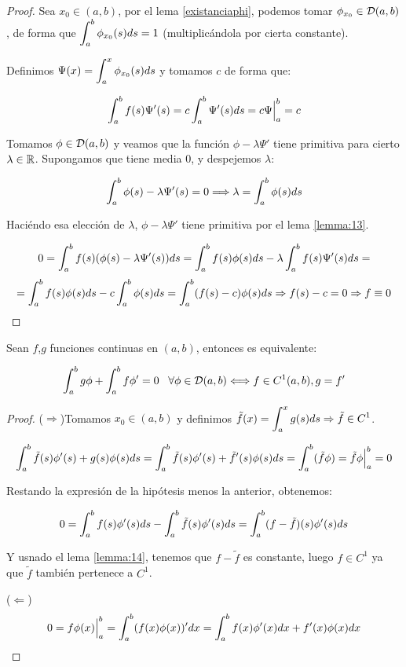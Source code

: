 \begin{proof}
Sea $x_0\in(a,b)$, por el lema \ref{existanciaphi}, podemos tomar $\phi_{x_0}\in \mathcal{D}(a,b)$, de forma que $\displaystyle\int_{ a }^{ b } \phi_{x_0}(s)ds=1$ (multiplicándola por cierta constante). 

Definimos $\Psi(x)=\displaystyle\int_{ a }^{ x } \phi_{x_0}(s)ds$ y tomamos $c$ de forma que:

\[
\displaystyle\int_{ a }^{ b } f(s)\Psi'(s)=c\displaystyle\int_{ a }^{ b } \Psi'(s)ds=c\Psi\Big|_a^b=c
\]

Tomamos $\phi\in\mathcal{D}(a,b)$ y veamos que la función $\phi-\lambda\Psi'$ tiene primitiva para cierto $\lambda\in\mathbb{R}$. Supongamos que tiene media 0, y despejemos $\lambda$:

\[
\displaystyle\int_{ a }^{ b } \phi(s)-\lambda\Psi'(s)=0 \Longrightarrow \lambda=\displaystyle\int_{ a }^{ b } \phi(s)ds
\]

Haciéndo esa elección de $\lambda$, $\phi-\lambda\Psi'$ tiene primitiva por el lema \ref{lemma:13}.

\[
0=\displaystyle\int_{ a }^{ b } f(s)(\phi(s)-\lambda\Psi'(s))ds=\displaystyle\int_{ a }^{ b } f(s)\phi(s)ds-\lambda\displaystyle\int_{ a }^{ b } f(s)\Psi'(s)ds=
\]
\[
=\displaystyle\int_{ a }^{ b } f(s)\phi(s)ds-c\displaystyle\int_{ a }^{ b } \phi(s)ds=\displaystyle\int_{ a }^{ b } (f(s)-c)\phi(s)ds \Rightarrow f(s)-c=0 \Rightarrow f\equiv 0
\]

\end{proof}

\begin{lemma}
Sean $f$,$g$ funciones continuas en $(a,b)$, entonces es equivalente:

\[
\displaystyle\int_{ a }^{ b } g\phi+\displaystyle\int_{ a }^{ b } f\phi'=0 \;\;\; \forall\phi\in\mathcal{D}(a,b) \Longleftrightarrow f\in C^1(a,b), g=f'
\]

\end{lemma}

\begin{proof}

($\Rightarrow$)Tomamos $x_0\in(a,b)$ y definimos $\tilde{f}(x)=\displaystyle\int_{ a }^{ x } g(s)ds\Rightarrow \tilde{f}\in C^1$.

\[
\displaystyle\int_{ a }^{ b } \tilde{f}(s)\phi'(s)+g(s)\phi(s)ds=\displaystyle\int_{ a }^{ b } \tilde{f}(s)\phi'(s)+\tilde{f}'(s)\phi(s)ds=\displaystyle\int_{ a }^{ b } (\tilde{f}\phi)=\tilde{f}\phi\Big|_a^b=0
\]

Restando la expresión de la hipótesis menos la anterior, obtenemos:

\[
0=\displaystyle\int_{ a }^{ b } f(s)\phi'(s)ds-\displaystyle\int_{ a }^{ b } \tilde{f}(s)\phi'(s)ds=\displaystyle\int_{ a }^{ b } (f-\tilde{f})(s)\phi'(s)ds
\]

Y usnado el lema \ref{lemma:14}, tenemos que $f-\tilde{f}$ es constante, luego $f\in C^1$ ya que $\tilde{f}$ también pertenece a $C^1$.

($\Leftarrow$) 
\[
0=f\phi(x)\Big|_a^b=\displaystyle\int_{ a }^{ b } (f(x)\phi(x))'dx=\displaystyle\int_{ a }^{ b } f(x)\phi'(x)dx+f'(x)\phi(x)dx
\]

\end{proof}

